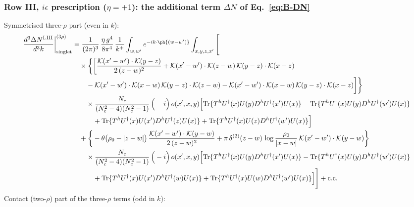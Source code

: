 \subsubsection*{Row III, $i\epsilon$ prescription ($\eta=+1$): the additional term $\Delta N$ of Eq.~\eqref{eq:B-DN}}
Symmetrised three-$\rho$ part (even in $k$):
\begin{align}
\frac{d^{3}\Delta N^{\rm I.III}}{d^{3}k}\bigg|^{(3\rho)}_{\rm singlet}&=\frac{1}{(2\pi)^{3}}\,\frac{\eta\,g^{4}}{8\pi^{4}}\,\frac{1}{k^{+}}\int_{w,w'}e^{-ik\cdot\ph{(w-w')}}\int_{x,y,z,x'}\Bigg[\notag\\
&\quad\times\bigg\{\bigg[\frac{\mathcal{K}(x'-w')\cdot\mathcal{K}(y-z)}{2\,(z-w)^{2}}+\mathcal{K}(x'-w')\cdot\mathcal{K}(z-w)\,\mathcal{K}(y-z)\cdot\mathcal{K}(x-z)\notag\\
&\qquad-\mathcal{K}(x'-w')\cdot\mathcal{K}(x-w)\,\mathcal{K}(y-z)\cdot\mathcal{K}(z-w)-\mathcal{K}(x'-w')\cdot\mathcal{K}(x-w)\,\mathcal{K}(y-z)\cdot\mathcal{K}(x-z)\bigg]\bigg\}\notag\\
&\qquad\times \frac{N_{c}}{(N_{c}^{2}-4)(N_{c}^{2}-1)}\,\Big(-i\Big)\,o(x',x,y)\Big[{\rm Tr}\{T^{h}U^{\dagger}(x)U(y)D^{h}U^{\dagger}(x')U(x)\}-{\rm Tr}\{T^{h}U^{\dagger}(x)U(y)D^{h}U^{\dagger}(w')U(x)\}\notag\\
&\qquad\quad +{\rm Tr}\{T^{h}U^{\dagger}(x)U(x')D^{h}U^{\dagger}(z)U(x)\}+{\rm Tr}\{T^{h}U^{\dagger}(x)U(z)D^{h}U^{\dagger}(w')U(x)\}\Big]\notag\\
&\quad+\bigg\{-\theta\big(\rho_{0}-|z-w|\big)\,\frac{\mathcal{K}(x'-w')\cdot\mathcal{K}(y-w)}{2\,(z-w)^{2}}+\pi\,\delta^{(2)}(z-w)\,\log\frac{\rho_{0}}{|x-w|}\,\mathcal{K}(x'-w')\cdot\mathcal{K}(y-w)\bigg\}\notag\\
&\qquad\times \frac{N_{c}}{(N_{c}^{2}-4)(N_{c}^{2}-1)}\,\Big(-i\Big)\,o(x',x,y)\Big[{\rm Tr}\{T^{h}U^{\dagger}(x)U(y)D^{h}U^{\dagger}(x')U(x)\}-{\rm Tr}\{T^{h}U^{\dagger}(x)U(y)D^{h}U^{\dagger}(w')U(x)\}\notag\\
&\qquad\quad +{\rm Tr}\{T^{h}U^{\dagger}(x)U(x')D^{h}U^{\dagger}(w)U(x)\}+{\rm Tr}\{T^{h}U^{\dagger}(x)U(w)D^{h}U^{\dagger}(w')U(x)\}\Big]\Bigg]+{\rm c.c.}\label{eq:E-I.IIIdN-3}
\end{align}
Contact (two-$\rho$) part of the three-$\rho$ terms (odd in $k$):
